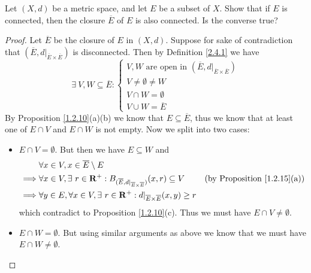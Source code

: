 \begin{exercise}\label{ex 2.4.8}
    Let \((X, d)\) be a metric space, and let \(E\) be a subset of \(X\).
    Show that if \(E\) is connected, then the closure \(\overline{E}\) of \(E\) is also connected.
    Is the converse true?
\end{exercise}

\begin{proof}
    Let \(\overline{E}\) be the closure of \(E\) in \((X, d)\).
    Suppose for sake of contradiction that \((\overline{E}, d|_{\overline{E} \times \overline{E}})\) is disconnected.
    Then by Definition \ref{2.4.1} we have
    \[
        \exists\ V, W \subseteq \overline{E} : \begin{cases}
            V, W \text{ are open in } (\overline{E}, d|_{\overline{E} \times \overline{E}}) \\
            V \neq \emptyset \neq W                                                         \\
            V \cap W = \emptyset                                                            \\
            V \cup W = \overline{E}
        \end{cases}
    \]
    By Proposition \ref{1.2.10}(a)(b) we know that \(E \subseteq \overline{E}\), thus we know that at least one of \(E \cap V\) and \(E \cap W\) is not empty.
    Now we split into two cases:
    \begin{itemize}
        \item \(E \cap V = \emptyset\).
              But then we have \(E \subseteq W\) and
              \begin{align*}
                           & \forall x \in V, x \in \overline{E} \setminus E                                                                                                              \\
                  \implies & \forall x \in V, \exists\ r \in \mathbf{R}^+ : B_{(\overline{E}, d|_{\overline{E} \times \overline{E}})}(x, r) \subseteq V & \text{(by Proposition \ref{1.2.15}(a))} \\
                  \implies & \forall y \in E, \forall x \in V, \exists\ r \in \mathbf{R}^+ : d|_{\overline{E} \times \overline{E}}(x, y) \geq r
              \end{align*}
              which contradict to Proposition \ref{1.2.10}(c).
              Thus we must have \(E \cap V \neq \emptyset\).
        \item \(E \cap W = \emptyset\).
              But using similar arguments as above we know that we must have \(E \cap W \neq \emptyset\).

\end{itemize}
\end{proof}
